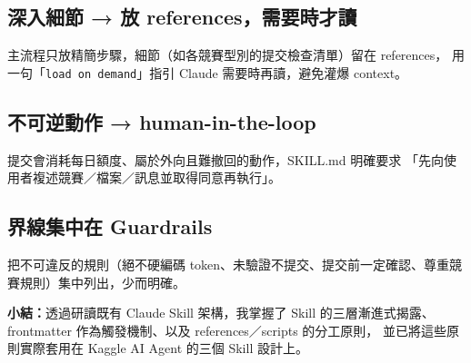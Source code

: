 \documentclass[11pt]{ctexart}
\newcommand{\code}[1]{\texttt{#1}}
\begin{document}
\subsection{深入細節 → 放 references，需要時才讀}
主流程只放精簡步驟，細節（如各競賽型別的提交檢查清單）留在 references，
用一句「\code{load on demand}」指引 Claude 需要時再讀，避免灌爆 context。

\subsection{不可逆動作 → human-in-the-loop}
提交會消耗每日額度、屬於外向且難撤回的動作，SKILL.md 明確要求
「先向使用者複述競賽／檔案／訊息並取得同意再執行」。

\subsection{界線集中在 Guardrails}
把不可違反的規則（絕不硬編碼 token、未驗證不提交、提交前一定確認、尊重競賽規則）集中列出，少而明確。

\vspace{1em}
\noindent\textbf{小結：}透過研讀既有 Claude Skill 架構，我掌握了 Skill 的三層漸進式揭露、
frontmatter 作為觸發機制、以及 references／scripts 的分工原則，
並已將這些原則實際套用在 Kaggle AI Agent 的三個 Skill 設計上。
\end{document}
